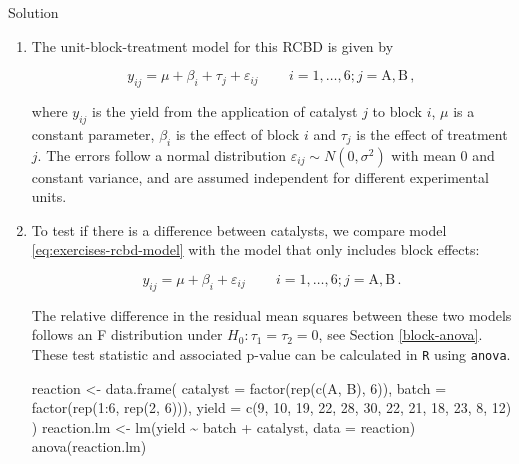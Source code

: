 \documentclass[
]{book}
\newenvironment{Shaded}{\begin{snugshade}}{\end{snugshade}}
\newcommand{\AttributeTok}[1]{\textcolor[rgb]{0.77,0.63,0.00}{#1}}
\newcommand{\DecValTok}[1]{\textcolor[rgb]{0.00,0.00,0.81}{#1}}
\newcommand{\FunctionTok}[1]{\textcolor[rgb]{0.00,0.00,0.00}{#1}}
\newcommand{\NormalTok}[1]{#1}
\newcommand{\OtherTok}[1]{\textcolor[rgb]{0.56,0.35,0.01}{#1}}
\newcommand{\SpecialCharTok}[1]{\textcolor[rgb]{0.00,0.00,0.00}{#1}}
\newcommand{\StringTok}[1]{\textcolor[rgb]{0.31,0.60,0.02}{#1}}
\theoremstyle{definition}
\theoremstyle{definition}
\theoremstyle{definition}
\theoremstyle{definition}
\theoremstyle{remark}
\begin{document}
Solution

\begin{enumerate}
\def\labelenumi{\roman{enumi}.}
\item
  The unit-block-treatment model for this RCBD is given by

  \begin{equation}
   y_{ij} = \mu + \beta_i + \tau_j + \varepsilon_{ij}\,\qquad i = 1, \ldots, 6; j = \mathrm{A}, \mathrm{B}\,,
   \label{eq:exercises-rcbd-model}
   \end{equation}

  where \(y_{ij}\) is the yield from the application of catalyst \(j\) to block \(i\), \(\mu\) is a constant parameter, \(\beta_i\) is the effect of block \(i\) and \(\tau_j\) is the effect of treatment \(j\). The errors follow a normal distribution \(\varepsilon_{ij}\sim N(0, \sigma^2)\) with mean 0 and constant variance, and are assumed independent for different experimental units.
\item
  To test if there is a difference between catalysts, we compare model \eqref{eq:exercises-rcbd-model} with the model that only includes block effects:

  \begin{equation}
  y_{ij} = \mu + \beta_i + \varepsilon_{ij}\,\qquad i = 1, \ldots, 6; j = \mathrm{A}, \mathrm{B}\,.
  \label{eq:exercises-rcbd-model-block}
   \end{equation}

  The relative difference in the residual mean squares between these two models follows an F distribution under \(H_0: \tau_1 = \tau_2 = 0\), see Section \ref{block-anova}. These test statistic and associated p-value can be calculated in \texttt{R} using \texttt{anova}.

\begin{Shaded}
\begin{Highlighting}[]
\NormalTok{reaction }\OtherTok{\textless{}{-}} \FunctionTok{data.frame}\NormalTok{(}
  \AttributeTok{catalyst =} \FunctionTok{factor}\NormalTok{(}\FunctionTok{rep}\NormalTok{(}\FunctionTok{c}\NormalTok{(}\StringTok{\textquotesingle{}A\textquotesingle{}}\NormalTok{, }\StringTok{\textquotesingle{}B\textquotesingle{}}\NormalTok{), }\DecValTok{6}\NormalTok{)),}
  \AttributeTok{batch =} \FunctionTok{factor}\NormalTok{(}\FunctionTok{rep}\NormalTok{(}\DecValTok{1}\SpecialCharTok{:}\DecValTok{6}\NormalTok{, }\FunctionTok{rep}\NormalTok{(}\DecValTok{2}\NormalTok{, }\DecValTok{6}\NormalTok{))),}
  \AttributeTok{yield =} \FunctionTok{c}\NormalTok{(}\DecValTok{9}\NormalTok{, }\DecValTok{10}\NormalTok{, }\DecValTok{19}\NormalTok{, }\DecValTok{22}\NormalTok{, }\DecValTok{28}\NormalTok{, }\DecValTok{30}\NormalTok{, }\DecValTok{22}\NormalTok{, }\DecValTok{21}\NormalTok{, }\DecValTok{18}\NormalTok{, }\DecValTok{23}\NormalTok{, }\DecValTok{8}\NormalTok{, }\DecValTok{12}\NormalTok{)}
\NormalTok{)}
\NormalTok{reaction.lm }\OtherTok{\textless{}{-}} \FunctionTok{lm}\NormalTok{(yield }\SpecialCharTok{\textasciitilde{}}\NormalTok{ batch }\SpecialCharTok{+}\NormalTok{ catalyst, }\AttributeTok{data =}\NormalTok{ reaction)}
\FunctionTok{anova}\NormalTok{(reaction.lm)}
\end{Highlighting}
\end{Shaded}


\end{enumerate}
\end{document}
